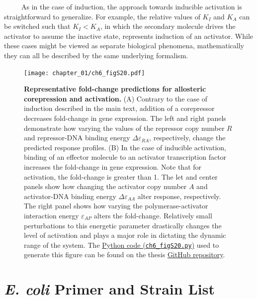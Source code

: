 \documentclass[12pt]{caltech_thesis}
\begin{document}
~~~~~As in the case of induction, the approach towards inducible
activation is straightforward to generalize. For example, the relative
values of \(K_I\) and \(K_A\) can be switched such that \(K_I < K_A\),
in which the secondary molecule drives the activator to assume the
inactive state, represents induction of an activator. While these cases
might be viewed as separate biological phenomena, mathematically they
can all be described by the same underlying formalism.

\hypertarget{fig:applications}{%
\begin{figure}
\centering
\texttt{[image: chapter\_01/ch6\_figS20.pdf]}
\caption[{Representative fold-change predictions for allosteric
corepression and activation.}]{\textbf{Representative fold-change
predictions for allosteric corepression and activation.} (A) Contrary to
the case of induction described in the main text, addition of a
corepressor decreases fold-change in gene expression. The left and right
panels demonstrate how varying the values of the repressor copy number
\(R\) and repressor-DNA binding energy \(\Delta\varepsilon_{RA}\),
respectively, change the predicted response profiles. (B) In the case of
inducible activation, binding of an effector molecule to an activator
transcription factor increases the fold-change in gene expression. Note
that for activation, the fold-change is greater than 1. The let and
center panels show how changing the activator copy number \(A\) and
activator-DNA binding energy \(\Delta\varepsilon_{AA}\) alter response,
respectively. The right panel shows how varying the polymerase-activator
interaction energy \(\varepsilon_{AP}\) alters the fold-change.
Relatively small perturbations to this energetic parameter drastically
changes the level of activation and plays a major role in dictating the
dynamic range of the system. The
\href{https://github.com/gchure/phd/blob/master/src/chapter_06/code/ch6_figS20.py}{Python
code (\texttt{ch6\_figS20.py})} used to generate this figure can be
found on the thesis \href{https://github.com/gchure/phd}{GitHub
repository}.}
\label{fig:applications}
\end{figure}
}

\hypertarget{e.-coli-primer-and-strain-list}{%
\section{\texorpdfstring{\emph{E. coli} Primer and Strain
List}{E. coli Primer and Strain List}}\label{e.-coli-primer-and-strain-list}}
\end{document}
